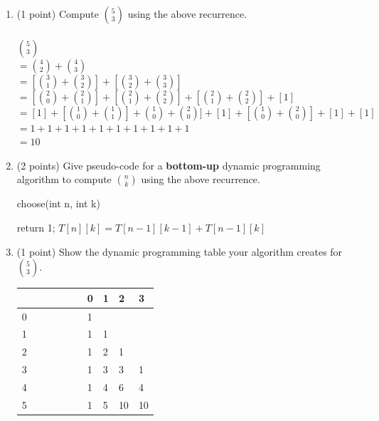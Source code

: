 \documentclass[12pt]{elsart}
\begin{document}
   \begin{enumerate}
      \item (1 point) Compute ${5 \choose 3}$ using the above recurrence.\\\\
	${5 \choose 3}$\\
	$ = {4 \choose 2}+{4 \choose 3}$\\
	$= [{3 \choose 1}+{3 \choose 2}] + [{3 \choose 2}+{3 \choose 3}]$\\
	$=[{2 \choose 0}+{2 \choose 1}]+[{2 \choose 1}+{2 \choose 2}]+[{2 \choose 1}+{2 \choose 2}]+[1]$\\
	$=[1]+[{1 \choose 0}+{1 \choose 1}]+{1 \choose 0}+{2 \choose 0}]+[1]+[{1 \choose 0}+{2 \choose 0}]+[1]+[1]$\\
	$=1+1+1+1+1+1+1+1+1+1$\\
	$=\boxed{10}$\\
      \item (2 points) Give pseudo-code for a {\bf bottom-up} dynamic programming algorithm to compute ${n \choose k}$ using the above recurrence.
	\begin{algorithm}
	\caption{choose(int n, int k)}
		\begin{algorithmic}
			\State return 1;
		\EndIf
				\State $T[n][k] = T[n-1][k-1]+T[n-1][k]$
			\EndFor
		\EndFor
		\end{algorithmic}
	\end{algorithm}
\newpage
      \item (1 point) Show the dynamic programming table your algorithm creates for ${5 \choose 3}$.

\begin{tabular}{ l||p{0.1\linewidth}|p{0.1\linewidth}|p{0.1\linewidth}|p{0.1\linewidth}|}
   & 0 & 1 & 2 & 3  \\
  \hline
  \hline
   0& 1 & \cellcolor{black!100} & \cellcolor{black!100}  & \cellcolor{black!100}\\
  \hline
   1& 1 & 1 & \cellcolor{black!100} & \cellcolor{black!100}\\
  \hline
   2& 1 & 2 & 1 & \cellcolor{black!100}\\
  \hline
   3& 1 & 3 & 3 & 1\\
  \hline
   4& 1 & 4 & 6 &4\\
  \hline
   5& 1 & 5 & 10 &10\\
  \hline
\end{tabular}
   \end{enumerate}
\end{document}
